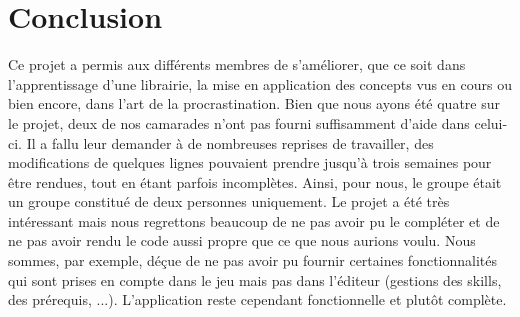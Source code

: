 \chapter{Conclusion}

	Ce projet a permis aux différents membres de s'améliorer, que ce soit dans l'apprentissage d'une librairie, la mise en application des concepts vus en cours ou bien encore, dans l'art de la procrastination. Bien que nous ayons été quatre sur le projet, deux de nos camarades n'ont pas fourni suffisamment d'aide dans celui-ci. Il a fallu leur demander à de nombreuses reprises de travailler, des modifications de quelques lignes pouvaient prendre jusqu'à trois semaines pour être rendues, tout en étant parfois incomplètes. Ainsi, pour nous, le groupe était un groupe constitué de deux personnes uniquement. Le projet a été très intéressant mais nous regrettons beaucoup de ne pas avoir pu le compléter et de ne pas avoir rendu le code aussi propre que ce que nous aurions voulu. Nous sommes, par exemple, déçue de ne pas avoir pu fournir certaines fonctionnalités qui sont prises en compte dans le jeu mais pas dans l'éditeur (gestions des skills, des prérequis, ...). L'application reste cependant fonctionnelle et plutôt complète.
